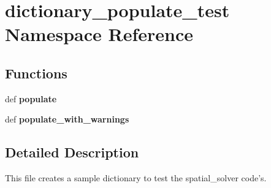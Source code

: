 \hypertarget{namespacedictionary__populate__test}{\section{dictionary\-\_\-populate\-\_\-test Namespace Reference}
\label{namespacedictionary__populate__test}
}
\subsection*{Functions}
\begin{DoxyCompactItemize}
\item 
\hypertarget{namespacedictionary__populate__test_a87be06a29ae062d50db1be2e806a54b7}{def {\bfseries populate}}\label{namespacedictionary__populate__test_a87be06a29ae062d50db1be2e806a54b7}

\item 
\hypertarget{namespacedictionary__populate__test_a88677c6b3cdec186c5e145dc2b3d05b2}{def {\bfseries populate\-\_\-with\-\_\-warnings}}\label{namespacedictionary__populate__test_a88677c6b3cdec186c5e145dc2b3d05b2}

\end{DoxyCompactItemize}


\subsection{Detailed Description}
\begin{DoxyVerb}This file creates a sample dictionary to test the spatial_solver code's.\end{DoxyVerb}
 